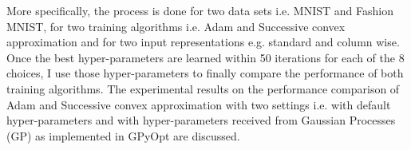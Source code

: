 More specifically, the process is done for two data sets i.e. MNIST and Fashion MNIST, for two training algorithms i.e. Adam and Successive convex approximation and for two input representations e.g. standard and column wise. Once the best hyper-parameters are learned within 50 iterations for each of the 8 choices, I use those hyper-parameters to finally compare the performance of both training algorithms. The experimental results on the performance comparison of Adam and Successive convex approximation with two settings i.e. with default hyper-parameters and with hyper-parameters received from Gaussian Processes (GP) as implemented in GPyOpt are discussed.

